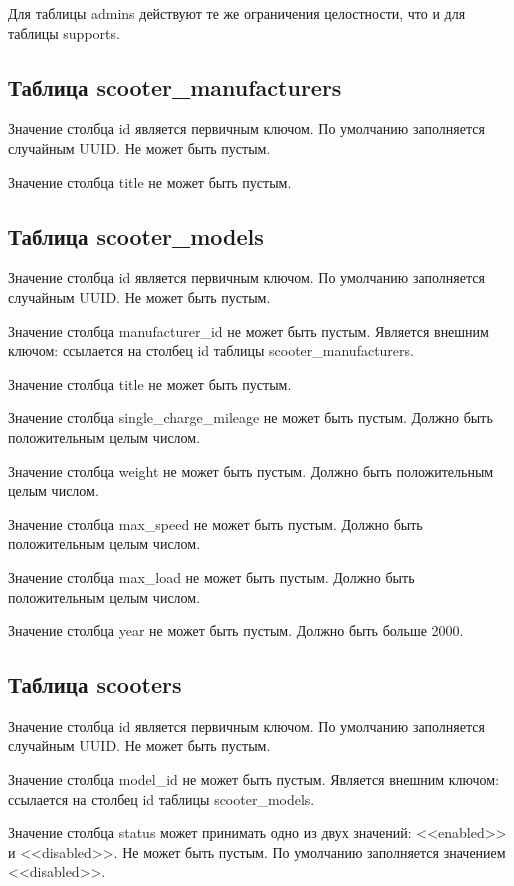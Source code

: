 Для таблицы admins действуют те же ограничения целостности, что и для таблицы supports.

\subsection{Таблица scooter\_manufacturers}

Значение столбца id является первичным ключом. По умолчанию заполняется случайным UUID. Не может быть пустым.

Значение столбца title не может быть пустым.

\subsection{Таблица scooter\_models}

Значение столбца id является первичным ключом. По умолчанию заполняется случайным UUID. Не может быть пустым.

Значение столбца manufacturer\_id не может быть пустым. Является внешним ключом: ссылается на столбец id таблицы scooter\_manufacturers.

Значение столбца title не может быть пустым.

Значение столбца single\_charge\_mileage не может быть пустым. Должно быть положительным целым числом.

Значение столбца weight не может быть пустым. Должно быть положительным целым числом.

Значение столбца max\_speed не может быть пустым. Должно быть положительным целым числом.

Значение столбца max\_load не может быть пустым. Должно быть положительным целым числом.

Значение столбца year не может быть пустым. Должно быть больше 2000.

\subsection{Таблица scooters}

Значение столбца id является первичным ключом. По умолчанию заполняется случайным UUID. Не может быть пустым.

Значение столбца model\_id не может быть пустым. Является внешним ключом: ссылается на столбец id таблицы scooter\_models.

Значение столбца status может принимать одно из двух значений: <<enabled>> и <<disabled>>. Не может быть пустым. По умолчанию заполняется значением <<disabled>>.

